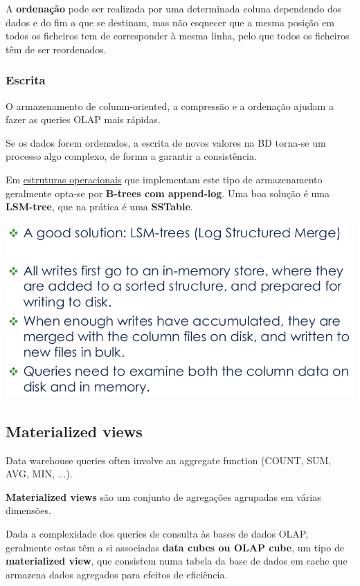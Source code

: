 \documentclass{article}
\begin{document}
A \textbf{ordenação} pode ser realizada por uma determinada coluna dependendo dos dados e do fim
a que se destinam, mas não esquecer que a mesma posição em todos os ficheiros tem de
corresponder à mesma linha, pelo que todos os ficheiros têm de ser reordenados.

\subsubsection{Escrita}

O armazenamento de column-oriented, a compressão e a ordenação ajudam
a fazer as queries OLAP mais rápidas.

Se os dados forem ordenados, a escrita de novos valores na BD torna-se um processo algo
complexo, de forma a garantir a consistência.

\vspace{2mm}

Em \uline{estruturas operacionais} que implementam este tipo de armazenamento geralmente opta-se
por \textbf{B-trees com append-log}. Uma boa solução é uma \textbf{LSM-tree}, que na prática é uma \textbf{SSTable}.

\begin{center}
  \includegraphics[scale=0.3]{52}
\end{center}

\pagebreak

\subsection{Materialized views}

Data warehouse queries often involve an
aggregate function (COUNT, SUM, AVG, MIN, ...).

\textbf{Materialized views} são um conjunto de agregações agrupadas em várias dimensões.

Dada a complexidade dos
queries de consulta às bases de dados OLAP, geralmente estas têm
a si associadas \textbf{data cubes ou OLAP cube}, um tipo de \textbf{materialized view}, que consistem numa tabela da base
de dados em
cache que armazena dados agregados para efeitos de eficiência.
\end{document}

